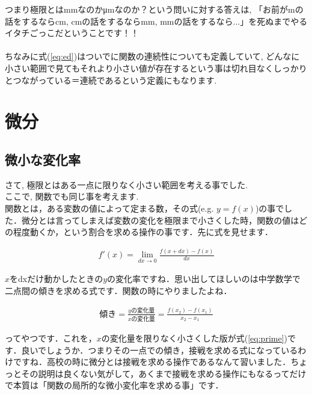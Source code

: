 \documentclass[11pt,a4paper,uplatex]{ujreport}
\begin{document}
つまり極限とはmmなのかμmなのか？という問いに対する答えは, 「お前がmの話をするならcm, cmの話をするならmm, mmの話をするなら...」を死ぬまでやるイタチごっこだということです！！\\
\\
ちなみに式(\ref{eq:ed})はついでに関数の連続性についても定義していて, どんなに小さい範囲で見てもそれより小さい値が存在するという事は切れ目なくしっかりとつながっている＝連続であるという定義にもなります.\\
\section{微分}
\subsection{微小な変化率}
さて, 極限とはある一点に限りなく小さい範囲を考える事でした.\\
ここで, 関数でも同じ事を考えます.\\

関数とは，ある変数の値によって定まる数，その式(e.g. $y = f(x)$)の事でした．微分とは言ってしまえば変数の変化を極限まで小さくした時，関数の値はどの程度動くか，という割合を求める操作の事です．先に式を見せます．

\begin{eqnarray}
\label{eq:prime}
f'(x) =\lim_{dx \rightarrow 0} \frac{f(x+dx) - f(x)}{dx}
\end{eqnarray}

$x$をdxだけ動かしたときの$y$の変化率ですね．思い出してほしいのは中学数学で二点間の傾きを求める式です．関数の時にやりましたよね．

\begin{eqnarray}
\text{傾き} = \frac{y\text{の変化量}}{x\text{の変化量}} = \frac{f(x_2) - f(x_1)}{x_2 - x_1}
\end{eqnarray}

ってやつです．これを，$x$の変化量を限りなく小さくした版が式(\ref{eq:prime})です．良いでしょうか．つまりその一点での傾き，接戦を求める式になっているわけですね．高校の時に微分とは接戦を求める操作であるなんて習いました．ちょっとその説明は良くない気がして，あくまで接戦を求める操作にもなるってだけで本質は「関数の局所的な微小変化率を求める事」です．\\
\end{document}
